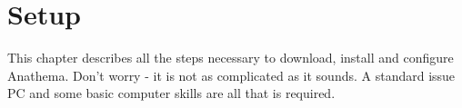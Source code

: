 \chapter{Setup}\label{chap:Setup}
This chapter describes all the steps necessary to download, install and configure Anathema. Don't worry - it is not as complicated as it sounds. A standard issue PC and some basic computer skills are all that is required.


